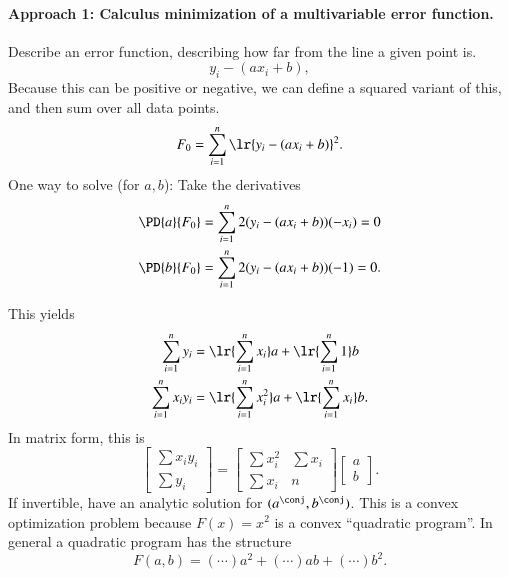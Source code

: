 \paragraph{Approach 1:  Calculus minimization of a multivariable error function.}
Describe an error function, describing how far from the line a given point is.
\begin{equation}\label{eqn:L1introduction:100}
y_i - (a x_i + b),
\end{equation}
Because this can be positive or negative, we can define a squared variant of this, and then sum over all data points.
\begin{equation}\label{eqn:L1introduction:120}
F_0 = \sum_{i=1}^n \lr{ y_i - (a x_i + b) }^2.
\end{equation}
One way to solve (for \( a, b \)): Take the derivatives
\begin{equation}\label{eqn:L1introduction:140}
\begin{aligned}
\PD{a}{F_0} &= \sum_{i=1}^n 2 ( y_i - (a x_i + b) )(-x_i) = 0 \\
\PD{b}{F_0} &= \sum_{i=1}^n 2 ( y_i - (a x_i + b) )(-1) = 0.
\end{aligned}
\end{equation}

This yields
\begin{equation}\label{eqn:L1introduction:160}
\begin{aligned}
\sum_{i = 1}^n y_i     &= \lr{\sum_{i = 1}^n x_i} a + \lr{\sum_{i = 1}^n 1} b \\
\sum_{i = 1}^n x_i y_i &= \lr{\sum_{i = 1}^n x_i^2} a + \lr{\sum_{i = 1}^n x_i} b.
\end{aligned}
\end{equation}
In matrix form, this is
\begin{equation}\label{eqn:L1introduction:180}
\begin{bmatrix}
\sum x_i y_i \\
\sum y_i
\end{bmatrix}
=
\begin{bmatrix}
\sum x_i^2 & \sum x_i \\
\sum x_i & n
\end{bmatrix}
\begin{bmatrix}
a \\
b
\end{bmatrix}.
\end{equation}
If invertible, have an analytic solution for \( (a^\conj, b^\conj) \).  This is a convex optimization problem because \( F(x) = x^2 \) is a convex ``quadratic program''.  In general a quadratic program has the structure
\begin{equation}\label{eqn:L1introduction:200}
F(a, b) = (\cdots) a^2 + (\cdots) a b + (\cdots) b^2.
\end{equation}
